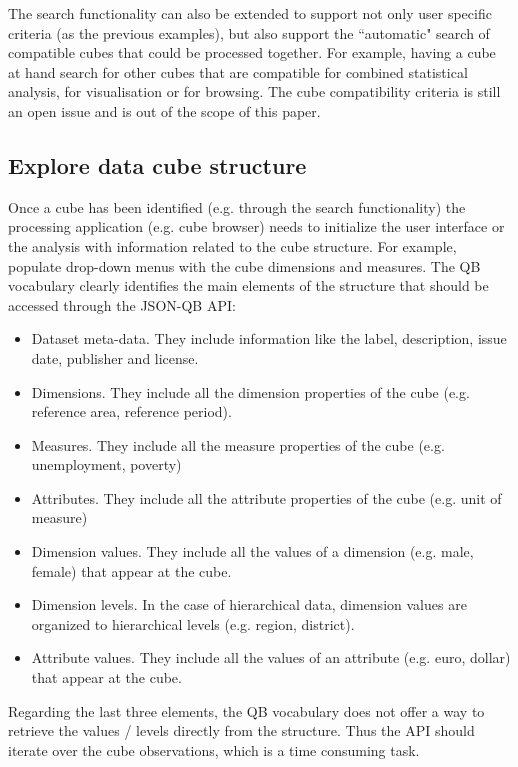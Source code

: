 \documentclass{llncs}
\begin{document}
The search functionality can also be extended to support not only user specific criteria (as the previous examples), but also support the ``automatic" search of compatible cubes that could be processed together. For example, having a cube at hand search for other cubes that are compatible for combined statistical analysis, for visualisation or for browsing. The cube compatibility criteria is still an open issue and is out of the scope of this paper. 

\subsection{Explore data cube structure}

Once a cube has been identified (e.g. through the search functionality) the processing application (e.g. cube browser) needs to initialize the user interface or the analysis with information related to the cube structure. For example, populate drop-down menus with the cube dimensions and measures. The QB vocabulary clearly identifies the main elements of the structure that should be accessed through the JSON-QB API:
\begin{itemize}
\item Dataset meta-data. They include information like the label, description, issue date, publisher and license.
\item Dimensions. They include all the dimension properties of the cube (e.g. reference area, reference period).
\item Measures. They include all the measure properties of the cube (e.g. unemployment, poverty)
\item Attributes. They include all the attribute properties of the cube (e.g. unit of measure)
\item Dimension values. They include all the values of a dimension (e.g. male, female) that appear at the cube. 
\item Dimension levels. In the case of hierarchical data, dimension values are organized to hierarchical levels (e.g. region, district).
\item Attribute values. They include all the values of an attribute (e.g. euro, dollar) that appear at the cube. 
\end{itemize} 

Regarding the last three elements, the QB vocabulary does not offer a way to retrieve the values / levels directly from the structure. Thus the API should iterate over the cube observations, which is a time consuming task.
\end{document}
